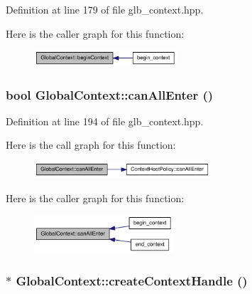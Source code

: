 Definition at line 179 of file glb\_\-context.hpp.

Here is the caller graph for this function:\nopagebreak
\begin{figure}[H]
\begin{center}
\leavevmode
\includegraphics[width=151pt]{class_global_context_a9d7b59f27bc2226614fe2a65f6c3d5d1_icgraph}
\end{center}
\end{figure}
\hypertarget{class_global_context_ac14dc301fa7de1207472da6f515a2f1f}{
\subsubsection[{canAllEnter}]{\setlength{\rightskip}{0pt plus 5cm}bool GlobalContext::canAllEnter ()}}
\label{class_global_context_ac14dc301fa7de1207472da6f515a2f1f}


Definition at line 194 of file glb\_\-context.hpp.

Here is the call graph for this function:\nopagebreak
\begin{figure}[H]
\begin{center}
\leavevmode
\includegraphics[width=186pt]{class_global_context_ac14dc301fa7de1207472da6f515a2f1f_cgraph}
\end{center}
\end{figure}


Here is the caller graph for this function:\nopagebreak
\begin{figure}[H]
\begin{center}
\leavevmode
\includegraphics[width=147pt]{class_global_context_ac14dc301fa7de1207472da6f515a2f1f_icgraph}
\end{center}
\end{figure}
\hypertarget{class_global_context_a933e43be2a62ca16e4ffa34ce5cadb5c}{
\subsubsection[{createContextHandle}]{$\ast$ GlobalContext::createContextHandle ()}}
\label{class_global_context_a933e43be2a62ca16e4ffa34ce5cadb5c}


